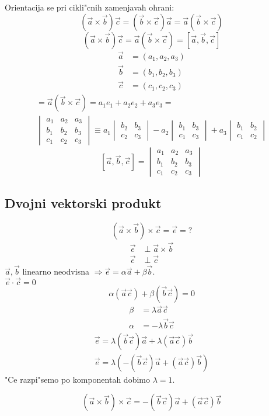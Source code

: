 Orientacija se pri cikli"cnih zamenjavah ohrani:
\[(\vec{a} \times \vec{b}) \vec{c} = (\vec{b} \times \vec{c})\vec{a} = \vec{a}(\vec{b} \times \vec{c})\]
%
\[(\vec{a} \times \vec{b})\vec{c} = \vec{a}(\vec{b} \times \vec{c}) = [\vec{a}, \vec{b}, \vec{c}]\]
%
\begin{align*}
	\vec{a} &= (a_1, a_2, a_3)\\
	\vec{b} &= (b_1, b_2, b_3)\\
	\vec{c} &= (c_1, c_2, c_3)
\end{align*}
%
\begin{align*}
	[\vec{a}, \vec{b}, \vec{c}] = \vec{a} (\vec{b} \times \vec{c}) = a_1e_1 + a_2e_2 + a_3e_3 =\\
	\begin{vmatrix}
	a_1 & a_2 & a_3 \\
	b_1 & b_2 & b_3 \\
	c_1 & c_2 & c_3
	\end{vmatrix} \equiv
	a_1 \begin{vmatrix}
	b_2 & b_3\\
	c_2 & c_3
	\end{vmatrix} - a_2
	\begin{vmatrix}
	b_1 & b_3 \\
	c_1 & c_3
	\end{vmatrix} + a_3
	\begin{vmatrix}
	b_1 & b_2\\
	c_1 & c_2
	\end{vmatrix}
\end{align*}
%
\[[\vec{a}, \vec{b}, \vec{c}] = \begin{vmatrix}
a_1 & a_2 & a_3 \\
b_1 & b_2 & b_3 \\
c_1 & c_2 & c_3
\end{vmatrix}\]

\subsection{Dvojni vektorski produkt}
\[(\vec{a} \times \vec{b}) \times \vec{c} = \vec{e} = ?\]
\begin{align*}
	\vec{e} &\perp \vec{a} \times \vec{b} \\
	\vec{e} &\perp \vec{c}
\end{align*}
%
$\vec{a}, \vec{b}$ linearno neodvisna $\Rightarrow \vec{e} = \alpha \vec{a} + \beta \vec{b}$.\\
$\vec{e} \cdot \vec{c} = 0$
%
\[\alpha (\vec{a} \vec{c}) + \beta (\vec{b} \vec{c}) = 0\]
\begin{align*}
	\beta &= \lambda \vec{a} \vec{c}\\
	\alpha &= - \lambda \vec{b} \vec{c}
\end{align*}
%
\begin{align*}
	\vec{e} = \lambda(\vec{b} \vec{c}) \vec{a} + \lambda (\vec{a} \vec{c}) \vec{b}\\
	\vec{e} = \lambda(-(\vec{b} \vec{c}) \vec{a} + (\vec{a}\vec{c}) \vec{b})
\end{align*}
"Ce razpi"semo po komponentah dobimo $\lambda = 1$.

\[(\vec{a} \times \vec{b}) \times \vec{c} = -(\vec{b} \vec{c}) \vec{a} + (\vec{a} \vec{c}) \vec{b}\]